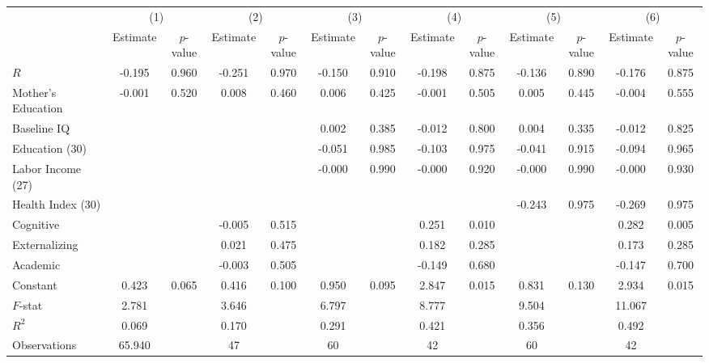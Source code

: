 \begin{table}[htbp]
\begin{tabular}{lcccccccccccc} \toprule
 & \multicolumn{2}{c}{(1)}  &  \multicolumn{2}{c}{(2)}  &  \multicolumn{2}{c}{(3)}  &  \multicolumn{2}{c}{(4)}  & \multicolumn{2}{c}{(5)} & \multicolumn{2}{c}{(6)} \\  
 & Estimate & $p$-value & Estimate & $p$-value & Estimate & $p$-value & Estimate & $p$-value & Estimate & $p$-value & Estimate & $p$-value \\ \midrule
$R$ &    -0.195 &     0.960 &    -0.251 &     0.970 &    -0.150 &     0.910 &    -0.198 &     0.875 &    -0.136 &     0.890 &    -0.176 &     0.875 \\  
Mother's Education &    -0.001 &     0.520 &     0.008 &     0.460 &     0.006 &     0.425 &    -0.001 &     0.505 &     0.005 &     0.445 &    -0.004 &     0.555 \\  
Baseline IQ &         &         &         &         &     0.002 &     0.385 &    -0.012 &     0.800 &     0.004 &     0.335 &    -0.012 &     0.825 \\  
Education (30) &         &         &         &         &    -0.051 &     0.985 &    -0.103 &     0.975 &    -0.041 &     0.915 &    -0.094 &     0.965 \\  
Labor Income (27) &         &         &         &         &    -0.000 &     0.990 &    -0.000 &     0.920 &    -0.000 &     0.990 &    -0.000 &     0.930 \\  
Health Index (30) &         &         &         &         &         &         &         &         &    -0.243 &     0.975 &    -0.269 &     0.975 \\  
Cognitive &         &         &    -0.005 &     0.515 &         &         &     0.251 &     0.010 &         &         &     0.282 &     0.005 \\  
Externalizing &         &         &     0.021 &     0.475 &         &         &     0.182 &     0.285 &         &         &     0.173 &     0.285 \\  
Academic &         &         &    -0.003 &     0.505 &         &         &    -0.149 &     0.680 &         &         &    -0.147 &     0.700 \\  
Constant &     0.423 &     0.065 &     0.416 &     0.100 &     0.950 &     0.095 &     2.847 &     0.015 &     0.831 &     0.130 &     2.934 &     0.015 \\  \midrule
$F$-stat &     2.781 &         &     3.646 &         &     6.797 &         &     8.777 &         &     9.504 &         &    11.067 &         \\  
$R^2$ &     0.069 &         &     0.170 &         &     0.291 &         &     0.421 &         &     0.356 &         &     0.492 &         \\  
Observations &    65.940 &         &    47 &         &    60  &         &    42 &         &    60 &         &    42 &         \\  
\bottomrule \end{tabular}
\end{table}
